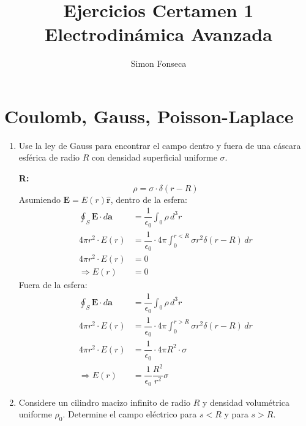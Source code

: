 \documentclass[]{article}
\title{Ejercicios Certamen 1 Electrodinámica Avanzada}
\author{Simon Fonseca}
\numberwithin{equation}{section}
\newcommand{\0}{\textcolor{gray}{0}}
\newcommand{\rv}{\mathbf{r}}
\newcommand{\rhat}{\hat{\rv}}
\newcommand{\eo}{\epsilon_{0}}
\newcommand{\n}[1]{\mathbf{#1}}
\begin{document}
\maketitle
\section{Coulomb, Gauss, Poisson-Laplace}
\begin{enumerate}
	\item Use la ley de Gauss para encontrar el campo dentro y fuera de una cáscara esférica de radio \(R\) con densidad superficial uniforme \(\sigma\).
	
	\textbf{R:} 
	\begin{equation*}
		\rho = \sigma\cdot\delta(r - R)
	\end{equation*}
	Asumiendo \(\n{E} = E(r)\rhat\), dentro de la esfera:
	\begin{align*}
		\oint_{S}\n{E}\cdot d\n{a} &= \dfrac{1}{\eo}\int_{0}\rho\, d^3 r\\
		4 \pi r^2 \cdot E(r) &= \dfrac{1}{\eo}\cdot 4\pi \int_{0}^{r<R}\sigma r^2 \delta(r - R)\, d r\\
		4 \pi r^2 \cdot E(r) &= 0\\
		\Rightarrow E(r) &= 0
	\end{align*}
	Fuera de la esfera:
	\begin{align*}
		\oint_{S}\n{E}\cdot d\n{a} &= \dfrac{1}{\eo}\int_{0}\rho\, d^3 r\\
		4 \pi r^2 \cdot E(r) &= \dfrac{1}{\eo}\cdot 4\pi \int_{0}^{r>R}\sigma r^2 \delta(r - R)\, d r\\
		4 \pi r^2 \cdot E(r) &= \dfrac{1}{\eo}\cdot 4\pi R^2 \cdot \sigma\\
		\Rightarrow E(r) &= \dfrac{1}{\eo} \dfrac{R^2}{r^2} \sigma
	\end{align*}
	
	\item Considere un cilindro macizo infinito de radio \(R\) y densidad volumétrica uniforme \(\rho_{0}\). Determine el campo eléctrico para \(s < R\) y para \(s > R\).
	

\end{enumerate}
\end{document}
